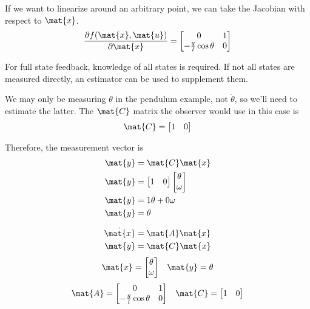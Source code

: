 If we want to linearize around an arbitrary point, we can take the Jacobian with
respect to $\mat{x}$.
\begin{equation*}
  \frac{\partial f(\mat{x}, \mat{u})}{\partial\mat{x}} =
  \begin{bmatrix}
    0 & 1 \\
    -\frac{g}{l}\cos\theta & 0
  \end{bmatrix}
\end{equation*}

For full \gls{state} feedback, knowledge of all \glspl{state} is required. If
not all \glspl{state} are measured directly, an estimator can be used to
supplement them.

We may only be measuring $\theta$ in the pendulum example, not $\dot{\theta}$,
so we'll need to estimate the latter. The $\mat{C}$ matrix the \gls{observer}
would use in this case is
\begin{equation*}
  \mat{C} = \begin{bmatrix}
    1 & 0 \\
  \end{bmatrix}
\end{equation*}

Therefore, the measurement vector is
\begin{align*}
  \mat{y} &= \mat{C}\mat{x} \\
  \mat{y} &= \begin{bmatrix}
    1 & 0
  \end{bmatrix}
  \begin{bmatrix}
    \theta \\
    \omega
  \end{bmatrix} \\
  \mat{y} &= 1\theta + 0\omega \\
  \mat{y} &= \theta
\end{align*}
\begin{theorem}
  \begin{align*}
    \dot{\mat{x}} &= \mat{A} \mat{x} \\
    \mat{y} &= \mat{C} \mat{x}
  \end{align*}
  \begin{equation*}
    \begin{array}{ccc}
      \mat{x} =
      \begin{bmatrix}
        \theta \\
        \omega
      \end{bmatrix} &
      \mat{y} = \theta
    \end{array}
  \end{equation*}
  \begin{equation}
    \begin{array}{cccc}
      \mat{A} =
      \begin{bmatrix}
        0 & 1 \\
        -\frac{g}{l}\cos\theta & 0
      \end{bmatrix} &
      \mat{C} =
      \begin{bmatrix}
        1 & 0
      \end{bmatrix}
    \end{array}
  \end{equation}
\end{theorem}

